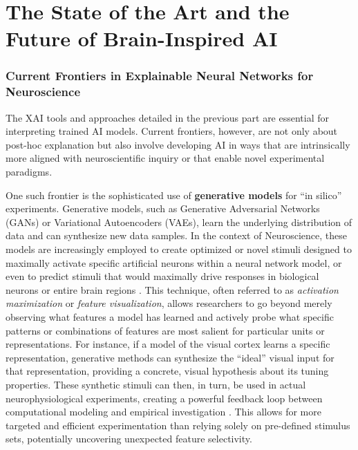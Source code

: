 \part{The State of the Art and the Future of Brain-Inspired AI}

\section{Current Frontiers in Explainable Neural Networks for Neuroscience}

The XAI tools and approaches detailed in the previous part are essential for interpreting trained AI models. Current frontiers, however, are not only about post-hoc explanation but also involve developing AI in ways that are intrinsically more aligned with neuroscientific inquiry or that enable novel experimental paradigms.

One such frontier is the sophisticated use of \textbf{generative models} for ``in silico'' experiments. Generative models, such as Generative Adversarial Networks (GANs) or Variational Autoencoders (VAEs), learn the underlying distribution of data and can synthesize new data samples. In the context of Neuroscience, these models are increasingly employed to create optimized or novel stimuli designed to maximally activate specific artificial neurons within a neural network model, or even to predict stimuli that would maximally drive responses in biological neurons or entire brain regions \cite{olah2018building}. This technique, often referred to as \textit{activation maximization} or \textit{feature visualization}, allows researchers to go beyond merely observing what features a model has learned and actively probe what specific patterns or combinations of features are most salient for particular units or representations. For instance, if a model of the visual cortex learns a specific representation, generative methods can synthesize the ``ideal'' visual input for that representation, providing a concrete, visual hypothesis about its tuning properties. These synthetic stimuli can then, in turn, be used in actual neurophysiological experiments, creating a powerful feedback loop between computational modeling and empirical investigation \cite{richards2019deep, kriegeskorte2018cognitive}. This allows for more targeted and efficient experimentation than relying solely on pre-defined stimulus sets, potentially uncovering unexpected feature selectivity.

